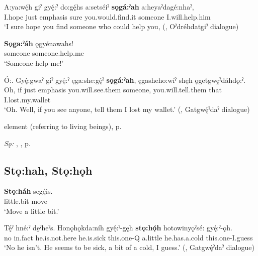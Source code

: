 \ea
\label{ex:spart66}
\gll A:ya:wę́h giˀ gyę́:ˀ do:gę́hs a:setséiˀ \textbf{sǫgá:ˀah} a:heyaˀdagé:nhaˀ,\\
I.hope just emphasis sure you.would.find.it someone I.will.help.him\\
\glt ‘I sure hope you find someone who could help you, (\cite[339]{mithun_watewayestanih_1984}, Oˀdréhdatgiˀ dialogue)
\z

\ea
\label{ex:spart63}
\gll \textbf{Sǫga:ˀáh} ǫgyénawahs!\\
someone someone.help.me\\
\glt ‘Someone help me!’
\z

\largerpage
\ea
\label{ex:spart64}
\gll Ó:. Gyę́:gwaˀ giˀ gyę́:ˀ ęga:she:gę́ˀ \textbf{sǫgá:ˀah}, ęgasheho:wíˀ shęh ǫgetgwę̱ˀdáhdǫ:ˀ.\\
Oh, if just emphasis you.will.see.them someone, you.will.tell.them that I.lost.my.wallet\\
\glt ‘Oh. Well, if you see anyone, tell them I lost my wallet.’ (\cite[184]{mithun_watewayestanih_1984}, Gatgwę́ˀdaˀ dialogue)
\z


\begin{CayugaRelated}
\item {} element (referring to living beings), p. \pageref{p:[-ga:ˀ]}\\
\item \textit{Sǫ:} , , p. \pageref{p:[sǫ:]}
\end{CayugaRelated}

\subsection*{\textbf{Stǫ:hah, Stǫ:hǫh} } \label{p:[stǫ:hah]}

\ea
\label{ex:spart82}
\gll \textbf{Stǫ:háh} segę́is.\\
little.bit move\\
\glt ‘Move a little bit.’
\z

\ea
\label{ex:spart83}
\gll Tę́ˀ hné:ˀ de̱ˀheˀs. Honǫhǫkda:níh gyę́:ˀ-gęh \textbf{stǫ:hǫ́h} hotowinyǫˀsé: gyę́:ˀ-ǫh.\\
no in.fact he.is.not.here he.is.sick this.one-Q a.little he.has.a.cold this.one-I.guess\\
\glt ‘No he isn’t. He seems to be sick, a bit of a cold, I guess.’ (\cite[184]{mithun_watewayestanih_1984}, Gatgwę́ˀdaˀ dialogue)
\z

